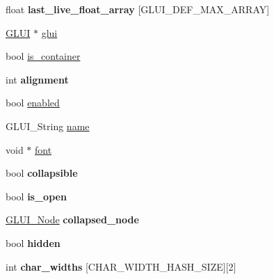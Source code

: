 \begin{DoxyCompactItemize}
\item 
\hypertarget{class_g_l_u_i___control_a719177af6b52ae3373d2b3c30430ff58}{float {\bfseries last\+\_\+live\+\_\+float\+\_\+array} \mbox{[}G\+L\+U\+I\+\_\+\+D\+E\+F\+\_\+\+M\+A\+X\+\_\+\+A\+R\+R\+A\+Y\mbox{]}}\label{class_g_l_u_i___control_a719177af6b52ae3373d2b3c30430ff58}

\item 
\hyperlink{class_g_l_u_i}{G\+L\+U\+I} $\ast$ \hyperlink{class_g_l_u_i___control_ac731aebe26d7eb0b916a9692229f0eb6}{glui}
\item 
bool \hyperlink{class_g_l_u_i___control_ac667bec4efbc9bdbf3e246b4471fb4cb}{is\+\_\+container}
\item 
\hypertarget{class_g_l_u_i___control_a5d352c36d6bad2a1eaf9795bba00b7e7}{int {\bfseries alignment}}\label{class_g_l_u_i___control_a5d352c36d6bad2a1eaf9795bba00b7e7}

\item 
bool \hyperlink{class_g_l_u_i___control_a834202682d00a31a2141eae6709d37e1}{enabled}
\item 
G\+L\+U\+I\+\_\+\+String \hyperlink{class_g_l_u_i___control_aa95b97d50df45335fc33f0af03958eb3}{name}
\item 
void $\ast$ \hyperlink{class_g_l_u_i___control_a132273406b5ea6d95cd26501fc2f2027}{font}
\item 
\hypertarget{class_g_l_u_i___control_a7a6528f287b80bed5861625eda4e5cad}{bool {\bfseries collapsible}}\label{class_g_l_u_i___control_a7a6528f287b80bed5861625eda4e5cad}

\item 
\hypertarget{class_g_l_u_i___control_a3e4e35edfa04ce71c090bdb849b7642c}{bool {\bfseries is\+\_\+open}}\label{class_g_l_u_i___control_a3e4e35edfa04ce71c090bdb849b7642c}

\item 
\hypertarget{class_g_l_u_i___control_a0f32f9b712ae3233f914d02738c43e7f}{\hyperlink{class_g_l_u_i___node}{G\+L\+U\+I\+\_\+\+Node} {\bfseries collapsed\+\_\+node}}\label{class_g_l_u_i___control_a0f32f9b712ae3233f914d02738c43e7f}

\item 
\hypertarget{class_g_l_u_i___control_aec1b041f28d8ee36a0241dde827fea21}{bool {\bfseries hidden}}\label{class_g_l_u_i___control_aec1b041f28d8ee36a0241dde827fea21}

\item 
\hypertarget{class_g_l_u_i___control_a3b24d8c0f29ab6fc2318278543906cb5}{int {\bfseries char\+\_\+widths} \mbox{[}C\+H\+A\+R\+\_\+\+W\+I\+D\+T\+H\+\_\+\+H\+A\+S\+H\+\_\+\+S\+I\+Z\+E\mbox{]}\mbox{[}2\mbox{]}}\label{class_g_l_u_i___control_a3b24d8c0f29ab6fc2318278543906cb5}

\end{DoxyCompactItemize}
